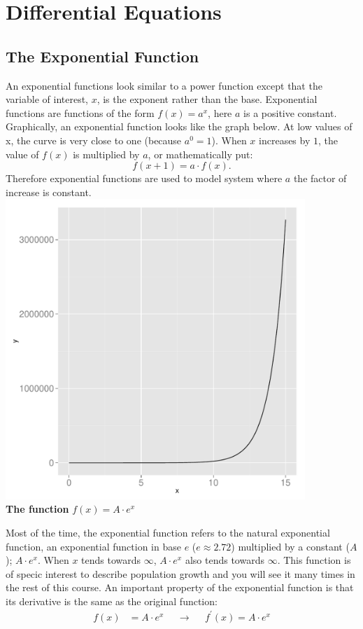 \documentclass[a4paper]{report}
\begin{document}

\section{Differential Equations}

\subsection{The Exponential Function}

An exponential functions look similar to a power function except that the variable of interest, $x$, is the exponent rather than the base. Exponential functions are functions of the form $f(x)=a^x$, here $a$ is a positive constant. Graphically, an exponential function looks like the graph below. At low values of x, the curve is very close to one (because $a^0=1$). When $x$ increases by $1$, the value of $f(x)$ is multiplied by $a$, or mathematically put:
\begin{equation}
f(x+1) = a \cdot f(x).
\end{equation}
Therefore exponential functions are used to model system where $a$ the factor of increase is constant.\\ 
\includegraphics[width=0.85\textwidth]{exponential_plot.pdf}\\


\textbf{The function} $f(x) = A \cdot e^x$


Most of the time, the exponential function refers to the natural exponential function, an exponential function in base $e$ ($e \approx 2.72$) multiplied by a constant ($A$); $A \cdot e^x$. When $x$ tends towards $\infty$, $A \cdot e^x$ also tends towards $\infty$. This function is of specic interest to describe population growth and you will see it many times in the rest of this course. An important property of the exponential function is that its derivative is the same as the original function:
\begin{align}
f(x)& = A \cdot e^x & &\rightarrow& & f^\prime(x) =  A \cdot e^x  
\end{align}
\end{document}
